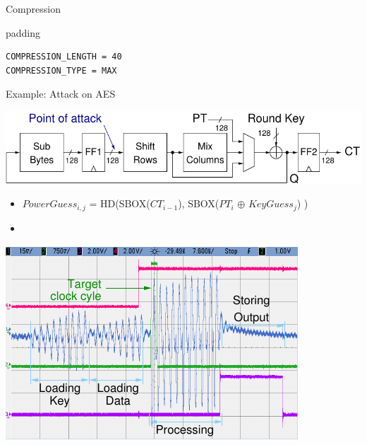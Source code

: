 \documentclass[final]{beamer}
\begin{document}
\begin{frame}[fragile]{}
\begin{columns}[t]
\begin{column}{.31\linewidth}
\begin{block}{Compression}
\begin{minipage}[t]{0.49\linewidth}
\begin{itemize}
         \end{itemize} 
          \begin{center}
            \begin{beamercolorbox}[rounded=true]{padding}%
               \footnotesize%
              \begin{lstlisting}
COMPRESSION_LENGTH = 40
COMPRESSION_TYPE = MAX
              \end{lstlisting}
            \end{beamercolorbox}
          \end{center}
        \end{minipage}
       \end{block}
       \begin{block}{Example: Attack on AES}
         \begin{center}
           \includegraphics[width=0.9\linewidth]{../figures/aes128}
         \end{center}
         \begin{itemize}
		 \item {\small $PowerGuess_{i, j}$ = HD(SBOX($CT_{i-1}$), SBOX($PT_{i}$ $\oplus$ $KeyGuess_{j}$) )}
		 \item
         \end{itemize}
	 \begin{minipage}[t]{0.49\linewidth}
			\includegraphics[width=0.80\linewidth]{../figures/oscilloscope-all-4ch} 
	 

\end{minipage}
\end{block}
\end{column}
\end{columns}
\end{frame}
\end{document}
